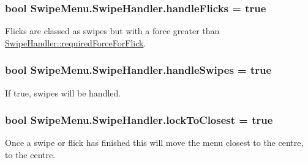 \subsubsection[{handle\+Flicks}]{\setlength{\rightskip}{0pt plus 5cm}bool Swipe\+Menu.\+Swipe\+Handler.\+handle\+Flicks = true}\label{class_swipe_menu_1_1_swipe_handler_a4a407fcf9a1bb1ac38ea8ea928b7345d}


Flicks are classed as swipes but with a force greater than \hyperlink{class_swipe_menu_1_1_swipe_handler_a94ba3d86d8da6741e1c01c135c72b54e}{Swipe\+Handler\+::required\+Force\+For\+Flick}. 

\hypertarget{class_swipe_menu_1_1_swipe_handler_af579c25de4671de28c630a531d2b66d2}{}
\subsubsection[{handle\+Swipes}]{\setlength{\rightskip}{0pt plus 5cm}bool Swipe\+Menu.\+Swipe\+Handler.\+handle\+Swipes = true}\label{class_swipe_menu_1_1_swipe_handler_af579c25de4671de28c630a531d2b66d2}


If true, swipes will be handled. 

\hypertarget{class_swipe_menu_1_1_swipe_handler_a7a532e6e4e29fc08b51a8dd839c197c0}{}
\subsubsection[{lock\+To\+Closest}]{\setlength{\rightskip}{0pt plus 5cm}bool Swipe\+Menu.\+Swipe\+Handler.\+lock\+To\+Closest = true}\label{class_swipe_menu_1_1_swipe_handler_a7a532e6e4e29fc08b51a8dd839c197c0}


Once a swipe or flick has finished this will move the menu closest to the centre, to the centre. 

\hypertarget{class_swipe_menu_1_1_swipe_handler_a94ba3d86d8da6741e1c01c135c72b54e}{}
